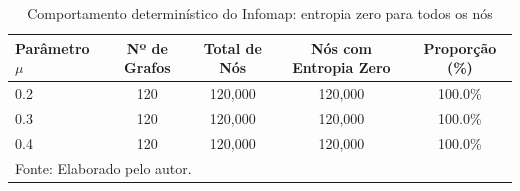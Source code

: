 \begin{table}[H]
\centering
\caption{Comportamento determinístico do Infomap: entropia zero para todos os nós}
\label{tab:infomap_deterministic}
\begin{tabular}{lcccc}
\hline
\textbf{Parâmetro $\mu$} & \textbf{Nº de Grafos} & \textbf{Total de Nós} & \textbf{Nós com Entropia Zero} & \textbf{Proporção (\%)} \\
\hline
0.2 & 120 & 120,000 & 120,000 & 100.0\% \\
0.3 & 120 & 120,000 & 120,000 & 100.0\% \\
0.4 & 120 & 120,000 & 120,000 & 100.0\% \\
\hline
\multicolumn{5}{l}{\footnotesize Fonte: Elaborado pelo autor.} \\
\end{tabular}
\end{table}